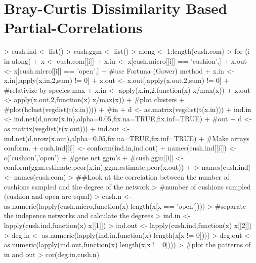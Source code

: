 \documentclass[12pt]{article}
\begin{document}
\section{Bray-Curtis Dissimilarity Based Partial-Correlations}

\begin{Schunk}
\begin{Sinput}
>     cush.ind <- list()
>     cush.ggm <- list()
>     along <- 1:length(cush.com)
>     for (i in along){
+       x <- cush.com[[i]]
+       x.in <- x[cush.micro[[i]] == 'cushion',]
+       x.out <- x[cush.micro[[i]] == 'open',]
+                                         #use Fortuna (Gower) method
+       x.in <- x.in[,apply(x.in,2,sum) != 0]
+       x.out <- x.out[,apply(x.out,2,sum) != 0]
+                                         #relativize by species max
+       x.in <- apply(x.in,2,function(x) x/max(x))
+       x.out <- apply(x.out,2,function(x) x/max(x))
+                                         #plot clusters
+                                         #plot(hclust(vegdist(t(x.in))))
+                                         #in
+       d <- as.matrix(vegdist(t(x.in)))
+       ind.in <- ind.net(d,nrow(x.in),alpha=0.05,fix.na=TRUE,fix.inf=TRUE)
+                                         #out
+       d <- as.matrix(vegdist(t(x.out)))
+       ind.out <- ind.net(d,nrow(x.out),alpha=0.05,fix.na=TRUE,fix.inf=TRUE)
+                                         #Make arrays conform.
+       cush.ind[[i]] <- conform(ind.in,ind.out)
+       names(cush.ind[[i]]) <- c('cushion','open')
+                                         #gene net ggm's
+                                         #cush.ggm[[i]] <- conform(ggm.estimate.pcor(x.in),ggm.estimate.pcor(x.out))
+     }
> names(cush.ind) <- names(cush.com)
> ##Look at the correlation between the number of cushions sampled and the degree of the network
>                                         #number of cushions sampled (cushion and open are equal)
> cush.n <- as.numeric(lapply(cush.micro,function(x) length(x[x == 'open'])))
>                                         #separate the indepence networks and calculate the degrees
> ind.in <- lapply(cush.ind,function(x) x[[1]])
> ind.out <- lapply(cush.ind,function(x) x[[2]])
> deg.in <- as.numeric(lapply(ind.in,function(x) length(x[x != 0])))
> deg.out <- as.numeric(lapply(ind.out,function(x) length(x[x != 0])))
>                                         #plot the patterns of in and out
> cor(deg.in,cush.n)
\end{Sinput}
\begin{Soutput}

\end{Soutput}
\end{Schunk}
\end{document}
